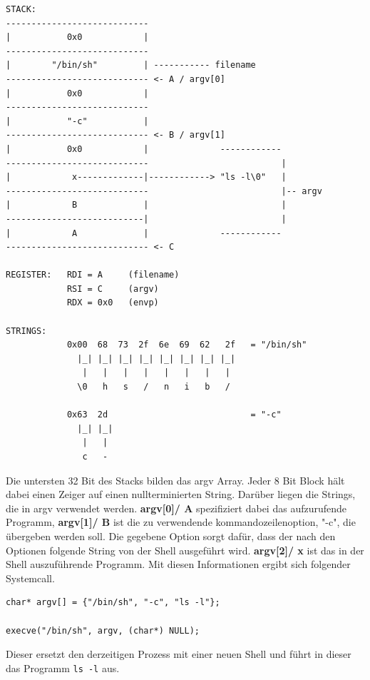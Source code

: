 \documentclass[12pt]{article}
\begin{document}
\begin{lstlisting}
STACK:
----------------------------
|           0x0            |    
----------------------------
|        "/bin/sh"         | ----------- filename
---------------------------- <- A / argv[0]
|           0x0            |                        
----------------------------                        
|           "-c"           |
---------------------------- <- B / argv[1]
|           0x0            |              ------------  
----------------------------                          |
|            x-------------|------------> "ls -l\0"   |
----------------------------                          |-- argv
|            B             |                          | 
---------------------------|                          |
|            A             |              ------------
---------------------------- <- C

REGISTER:   RDI = A     (filename)
            RSI = C     (argv)
            RDX = 0x0   (envp)

STRINGS:
            0x00  68  73  2f  6e  69  62   2f   = "/bin/sh"
              |_| |_| |_| |_| |_| |_| |_| |_|
               |   |   |   |   |   |   |   |
              \0   h   s   /   n   i   b   /

            0x63  2d                            = "-c"
              |_| |_|
               |   |
               c   -

\end{lstlisting}

Die untersten 32 Bit des Stacks bilden das argv Array. Jeder 8 Bit Block hält dabei einen Zeiger auf einen nullterminierten String. Darüber liegen die Strings, die in argv verwendet werden. \textbf{argv[0]/ A} spezifiziert dabei das aufzurufende Programm, \textbf{argv[1]/ B} ist die zu verwendende kommandozeilenoption, "-c", die übergeben werden soll. Die gegebene Option sorgt dafür, dass der nach den Optionen folgende String von der Shell ausgeführt wird. \textbf{argv[2]/ x} ist das in der Shell auszuführende Programm.
\newline
\newline
Mit diesen Informationen ergibt sich folgender Systemcall.

\begin{lstlisting}
char* argv[] = {"/bin/sh", "-c", "ls -l"};

execve("/bin/sh", argv, (char*) NULL);
\end{lstlisting}
Dieser ersetzt den derzeitigen Prozess mit einer neuen Shell und führt in dieser das Programm \texttt{ls -l} aus.
\end{document}
